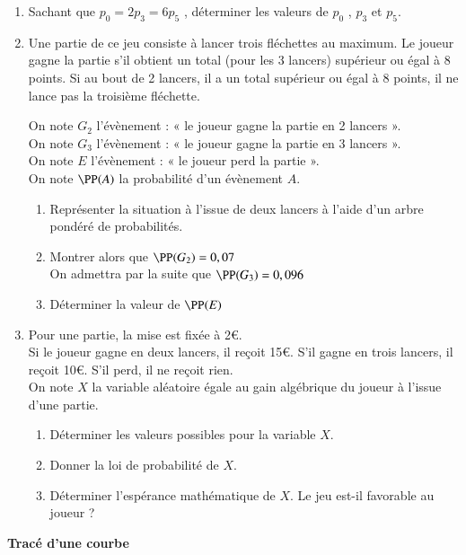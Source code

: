 \documentclass[oneside,12pt]{article}
\begin{document}
\begin{enumerate}
	\item Sachant que $p_0=2p_3=6p_5$ , déterminer les valeurs de $p_0$ , $p_3$ et $p_5$.
	\item Une partie de ce jeu consiste à lancer trois fléchettes au maximum. Le joueur gagne la partie s’il obtient un total (pour les 3 lancers) supérieur ou égal à 8 points. Si au bout de 2 lancers, il a un total supérieur ou égal à 8 points, il ne lance pas la troisième fléchette.
	
	On note $G_2$ l’évènement : « le joueur gagne la partie en 2 lancers ».\\
	On note $G_3$ l’évènement : « le joueur gagne la partie en 3 lancers ».\\
	On note $E$ l’évènement : « le joueur perd la partie ».\\
	On note $\PP(A)$ la probabilité d’un évènement $A$.
	\begin{enumerate}
		\item Représenter la situation à l'issue de deux lancers à l'aide d'un arbre pondéré de probabilités.
		\item Montrer alors que $\PP(G_2)=0,07$ \\
		On admettra par la suite que $\PP(G_3)=0,096$
		\item Déterminer la valeur de $\PP(E)$
	\end{enumerate}
	\item Pour une partie, la mise est fixée à 2\euro. \\
	Si le joueur gagne en deux lancers, il reçoit 15\euro. S’il gagne en trois lancers, il reçoit 10\euro. S’il perd, il ne reçoit rien. \\
	On note $X$ la variable aléatoire égale au gain algébrique du joueur à l'issue d'une partie.
	\begin{enumerate}
		\item Déterminer les valeurs possibles pour la variable $X$.
		\item Donner la loi de probabilité de $X$.
		\item Déterminer l’espérance mathématique de $X$. Le jeu est-il favorable au joueur ?
	\end{enumerate}
\end{enumerate}






\newpage
\textbf{\huge Tracé d'une courbe}
\end{document}
